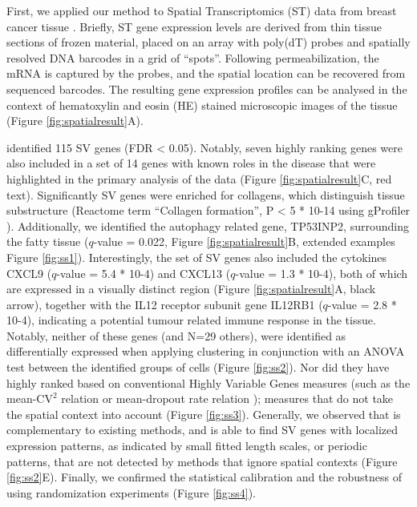 First, we applied our method to Spatial Transcriptomics (ST) data from breast cancer tissue \cite{Stahl2016-ym}. Briefly, ST gene expression levels are derived from thin tissue sections of frozen material, placed on an array with poly(dT) probes and spatially resolved DNA barcodes in a grid of “spots”. Following permeabilization, the mRNA is captured by the probes, and the spatial location can be recovered from sequenced barcodes. The resulting gene expression profiles can be analysed in the context of hematoxylin and eosin (HE) stained microscopic images of the tissue (Figure \ref{fig:spatialresult}A).

 identified 115 SV genes (FDR < 0.05). Notably, seven highly ranking genes were also included in a set of 14 genes with known roles in the disease that were highlighted in the primary analysis of the data (Figure \ref{fig:spatialresult}C, red text). Significantly SV genes were enriched for collagens, which distinguish tissue substructure \cite{Seewaldt2012-lk} (Reactome term “Collagen formation”, P < 5 * 10-14 using gProfiler \cite{Reimand2016-nz}). Additionally, we identified the autophagy related gene, TP53INP2, surrounding the fatty tissue (\( q \)-value = 0.022, Figure \ref{fig:spatialresult}B, extended examples Figure \ref{fig:ss1}). Interestingly, the set of SV genes also included the cytokines CXCL9 (\( q \)-value = 5.4 * 10-4) and CXCL13 (\( q \)-value = 1.3 * 10-4), both of which are expressed in a visually distinct region (Figure \ref{fig:spatialresult}A, black arrow), together with the IL12 receptor subunit gene IL12RB1 (\( q \)-value = 2.8 * 10-4), indicating a potential tumour related immune response in the tissue. Notably, neither of these genes (and N=29 others), were identified as differentially expressed when applying clustering in conjunction with an ANOVA test between the identified groups of cells (Figure \ref{fig:ss2}). Nor did they have highly ranked based on conventional Highly Variable Genes measures (such as the mean-\( \text{CV}^2 \) relation \cite{Brennecke2013-vv} or mean-dropout rate relation \cite{Andrews2016-ky}); measures that do not take the spatial context into account (Figure \ref{fig:ss3}). Generally, we observed that  is complementary to existing methods, and is able to find SV genes with localized expression patterns, as indicated by small fitted length scales, or periodic patterns, that are not detected by methods that ignore spatial contexts (Figure \ref{fig:ss2}E). Finally, we confirmed the statistical calibration and the robustness of  using randomization experiments (Figure \ref{fig:ss4}). 

